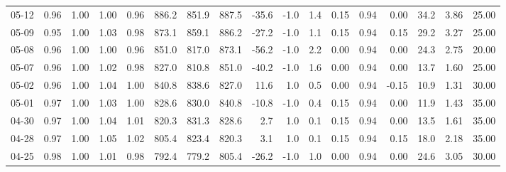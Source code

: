 \begin{threeparttable}
{\begin{tabular}{lrrrrrrrrrrrrrrrr}
  05-12 &         0.96 &           1.00 &          1.00 &          0.96 & 886.2 &  851.9 & 887.5 &      -35.6 &                     -1.0 &                 1.4 &       0.15 &      0.94 &           0.00 &             34.2 &            3.86 &                  25.00 \\
  05-09 &         0.95 &           1.00 &          1.03 &          0.98 & 873.1 &  859.1 & 886.2 &      -27.2 &                     -1.0 &                 1.1 &       0.15 &      0.94 &           0.15 &             29.2 &            3.27 &                  25.00 \\
  05-08 &         0.96 &           1.00 &          1.00 &          0.96 & 851.0 &  817.0 & 873.1 &      -56.2 &                     -1.0 &                 2.2 &       0.00 &      0.94 &           0.00 &             24.3 &            2.75 &                  20.00 \\
  05-07 &         0.96 &           1.00 &          1.02 &          0.98 & 827.0 &  810.8 & 851.0 &      -40.2 &                     -1.0 &                 1.6 &       0.00 &      0.94 &           0.00 &             13.7 &            1.60 &                  25.00 \\
  05-02 &         0.96 &           1.00 &          1.04 &          1.00 & 840.8 &  838.6 & 827.0 &       11.6 &                      1.0 &                 0.5 &       0.00 &      0.94 &          -0.15 &             10.9 &            1.31 &                  30.00 \\
  05-01 &         0.97 &           1.00 &          1.03 &          1.00 & 828.6 &  830.0 & 840.8 &      -10.8 &                     -1.0 &                 0.4 &       0.15 &      0.94 &           0.00 &             11.9 &            1.43 &                  35.00 \\
  04-30 &         0.97 &           1.00 &          1.04 &          1.01 & 820.3 &  831.3 & 828.6 &        2.7 &                      1.0 &                 0.1 &       0.15 &      0.94 &           0.00 &             13.5 &            1.61 &                  35.00 \\
  04-28 &         0.97 &           1.00 &          1.05 &          1.02 & 805.4 &  823.4 & 820.3 &        3.1 &                      1.0 &                 0.1 &       0.15 &      0.94 &           0.15 &             18.0 &            2.18 &                  35.00 \\
  04-25 &         0.98 &           1.00 &          1.01 &          0.98 & 792.4 &  779.2 & 805.4 &      -26.2 &                     -1.0 &                 1.0 &       0.00 &      0.94 &           0.00 &             24.6 &            3.05 &                  30.00 \\

\end{tabular}}
\end{threeparttable}

